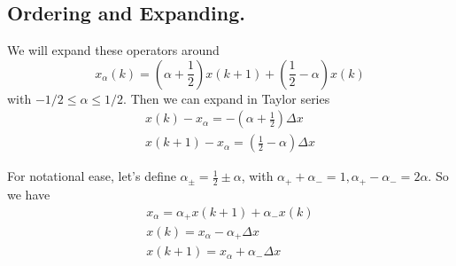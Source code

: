 \subsection{Ordering and Expanding.}

We will expand these operators around 
\begin{equation}
x_\alpha(k) = \left(\alpha+\frac{1}{2}\right)x(k+1) + \left(\frac{1}{2}-\alpha\right)x(k)
\end{equation}
with $-1/2\le \alpha \le 1/2$.  Then we can expand in Taylor series 
\begin{gather}
\boxed{x(k)-x_\alpha   = -\left(\alpha+\frac{1}{2}\right)\Delta x}\\
\boxed{x(k+1)-x_\alpha = \left(\frac{1}{2}-\alpha\right)\Delta x}
\end{gather}

For notational ease, let's define $\alpha_\pm = \frac{1}{2} \pm \alpha$, with $\alpha_++\alpha_- =1, \alpha_+-\alpha_- = 2\alpha$. So we have 
\begin{gather}
x_\alpha = \alpha_+ x(k+1) + \alpha_-x(k)\\
x(k)   = x_\alpha-\alpha_+\Delta x \\
x(k+1) = x_\alpha+\alpha_-\Delta x
\end{gather}

